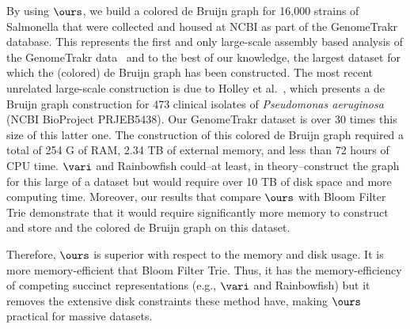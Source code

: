 By using $\ours$, we build a colored de Bruijn graph for 16,000 strains of Salmonella that were collected and housed at NCBI as part of the GenomeTrakr database.  This represents the first and only large-scale assembly based analysis of the GenomeTrakr data~\cite{pettengill2016} and to the best of our knowledge, the largest dataset for which the (colored) de Bruijn graph has been constructed.  The most recent unrelated large-scale construction is due to  Holley et al.~\cite{holley2015bloom}, which presents a de Bruijn graph construction for 473 clinical isolates of {\em Pseudomonas aeruginosa} (NCBI BioProject PRJEB5438).  Our GenomeTrakr dataset is over 30 times this size of this latter one.   The construction of this colored de Bruijn graph required a total of 254 G of RAM, 2.34 TB of external memory, and less than 72 hours of CPU time.  $\vari$ and Rainbowfish could--at least, in theory--construct the graph for this large of a dataset but would require over 10 TB of disk space and more computing time.  Moreover, our results that compare $\ours$ with Bloom Filter Trie demonstrate that it would require significantly more memory to construct and store and the colored de Bruijn graph on this dataset.  

Therefore, $\ours$ is superior with respect to the memory and disk usage.  It is more memory-efficient that Bloom Filter Trie.   Thus, it has the memory-efficiency of competing succinct representations (e.g., $\vari$ and Rainbowfish) but it removes the extensive disk constraints these method have, making $\ours$ practical for massive datasets.  





